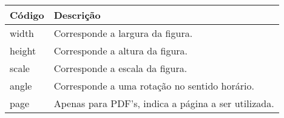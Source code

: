 % 
% 
% 
% 
% 
\begin{tabular}{lp{}}
    \hline
    Código & Descrição \\ \hline
    \textsf{width} & Corresponde a largura da figura. \\
    \textsf{height} & Corresponde a altura da figura. \\
    \textsf{scale} & Corresponde a escala da figura. \\
    \textsf{angle} & Corresponde a uma rotação no sentido horário. \\
    \textsf{page} & Apenas para \textsf{PDF}'s, indica a página a ser utilizada. \\ \hline
\end{tabular}
